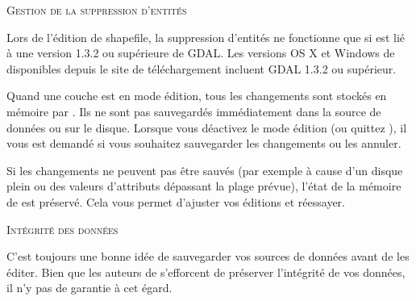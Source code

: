 \begin{Tip}[ht]\caption{\textsc{Gestion de la suppression d'entités}}
Lors de l'édition de shapefile, la suppression d'entités ne fonctionne que si \qg est lié à une version 1.3.2 ou supérieure de GDAL. Les versions OS X et Windows de \qg disponibles depuis le site de téléchargement incluent GDAL 1.3.2 ou supérieur.
\end{Tip}


Quand une couche est en mode édition, tous les changements sont stockés en mémoire par \qg. Ils ne sont pas sauvegardés immédiatement dans la source de données ou sur le disque. Lorsque vous déactivez le mode édition (ou quittez \qg), il vous est demandé si vous souhaitez sauvegarder les changements ou les annuler.

Si les changements ne peuvent pas être sauvés (par exemple à cause d'un disque plein ou des valeurs d'attributs dépassant la plage prévue), l'état de la mémoire de \qg est préservé. Cela vous permet d'ajuster vos éditions et réessayer.

\begin{Tip}[ht]\caption{\textsc{Intégrité des données}}
C'est toujours une bonne idée de sauvegarder vos sources de données avant de les éditer. Bien que les auteurs de \qg s'efforcent de préserver l'intégrité de vos données, il n'y pas de garantie à cet égard.
\end{Tip}


